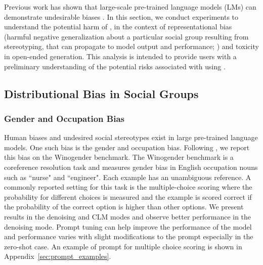 Previous work has shown that large-scale pre-trained language models (LMs) can demonstrate undesirable biases \citep{sheng-etal-2021-societal, osti_10098355, dev_measuring_2020, Liang2021TowardsUA, 10.1145/3531146.3533088}. In this section, we conduct experiments to understand the potential harm of \modelname, in the context of representational bias (harmful negative generalization about a particular social group resulting from stereotyping, that can propagate to model output and performance; \citealt{blodgett-etal-2020-language}) and toxicity in open-ended generation. This analysis is intended to provide users with a preliminary understanding of the potential risks associated with using \modelname.

\subsection{Distributional Bias in Social Groups}



\subsubsection{Gender and Occupation Bias}
Human biases and undesired social stereotypes exist in large pre-trained language models. One such bias is the gender and occupation bias. Following \citep{Chowdhery2022PaLMSL}, we report this bias on the Winogender benchmark. The Winogender benchmark is a coreference resolution task and measures gender bias in English occupation nouns such as ``nurse" and ``engineer". Each example has an unambiguous reference. A commonly reported setting for this task is the multiple-choice scoring where the probability for different choices is measured and the example is scored correct if the probability of the correct option is higher than other options. We present results in the denoising and CLM modes and observe better performance in the denoising mode. Prompt tuning can help improve the performance of the model and performance varies with slight modifications to the prompt especially in the zero-shot case. An example of prompt for multiple choice scoring is shown in Appendix~\ref{sec:prompt_examples}. 




